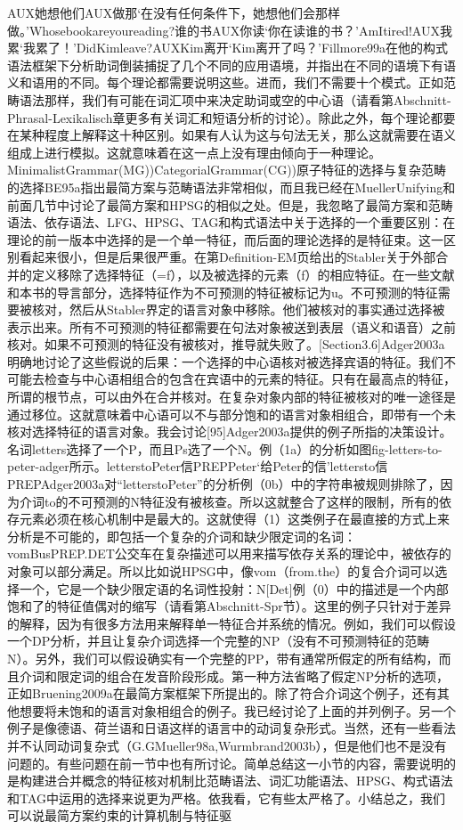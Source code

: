 AUX她想他们AUX做那`在没有任何条件下，她想他们会那样做。'Whosebookareyoureading?谁的书AUX你读`你在读谁的书？'AmItired!AUX我累`我累了！'DidKimleave?AUXKim离开`Kim离开了吗？'Fillmore99a在他的构式语法框架下分析助词倒装捕捉了几个不同的应用语境，并指出在不同的语境下有语义和语用的不同。每个理论都需要说明这些。进而，我们不需要十个模式。正如范畴语法那样，我们有可能在词汇项中来决定助词或空的中心语（请看第Abschnitt-Phrasal-Lexikalisch章更多有关词汇和短语分析的讨论）。除此之外，每个理论都要在某种程度上解释这十种区别。如果有人认为这与句法无关，那么这就需要在语义组成上进行模拟。这就意味着在这一点上没有理由倾向于一种理论。MinimalistGrammar(MG))CategorialGrammar(CG))原子特征的选择与复杂范畴的选择BE95a指出最简方案与范畴语法非常相似，而且我已经在MuellerUnifying和前面几节中讨论了最简方案和HPSG的相似之处。但是，我忽略了最简方案和范畴语法、依存语法、LFG、HPSG、TAG和构式语法中关于选择的一个重要区别：在理论的前一版本中选择的是一个单一特征，而后面的理论选择的是特征束。这一区别看起来很小，但是后果很严重。在第Definition-EM页给出的Stabler关于外部合并的定义移除了选择特征（=f），以及被选择的元素（f）的相应特征。在一些文献和本书的导言部分，选择特征作为不可预测的特征被标记为u。不可预测的特征需要被核对，然后从Stabler界定的语言对象中移除。他们被核对的事实通过选择被表示出来。所有不可预测的特征都需要在句法对象被送到表层（语义和语音）之前核对。如果不可预测的特征没有被核对，推导就失败了。[Section3.6]Adger2003a明确地讨论了这些假说的后果：一个选择的中心语核对被选择宾语的特征。我们不可能去检查与中心语相组合的包含在宾语中的元素的特征。只有在最高点的特征，所谓的根节点，可以由外在合并核对。在复杂对象内部的特征被核对的唯一途径是通过移位。这就意味着中心语可以不与部分饱和的语言对象相组合，即带有一个未核对选择特征的语言对象。我会讨论[95]Adger2003a提供的例子所指的决策设计。名词letters选择了一个P，而且Ps选了一个N。例（1a）的分析如图fig-letters-to-peter-adger所示。letterstoPeter信PREPPeter`给Peter的信'lettersto信PREPAdger2003a对“letterstoPeter”的分析例（0b）中的字符串被规则排除了，因为介词to的不可预测的N特征没有被核查。所以这就整合了这样的限制，所有的依存元素必须在核心机制中是最大的。这就使得（1）这类例子在最直接的方式上来分析是不可能的，即包括一个复杂的介词和缺少限定词的名词：vomBusPREP.DET公交车在复杂描述可以用来描写依存关系的理论中，被依存的对象可以部分满足。所以比如说HPSG中，像vom（from.the）的复合介词可以选择一个，它是一个缺少限定语的名词性投射：N[Det]例（0）中的描述是一个内部饱和了的特征值偶对的缩写（请看第Abschnitt-Spr节）。这里的例子只针对于差异的解释，因为有很多方法用来解释单一特征合并系统的情况。例如，我们可以假设一个DP分析，并且让复杂介词选择一个完整的NP（没有不可预测特征的范畴N）。另外，我们可以假设确实有一个完整的PP，带有通常所假定的所有结构，而且介词和限定词的组合在发音阶段形成。第一种方法省略了假定NP分析的选项，正如Bruening2009a在最简方案框架下所提出的。除了符合介词这个例子，还有其他想要将未饱和的语言对象相组合的例子。我已经讨论了上面的并列例子。另一个例子是像德语、荷兰语和日语这样的语言中的动词复杂形式。当然，还有一些看法并不认同动词复杂式（G.GMueller98a,Wurmbrand2003b），但是他们也不是没有问题的。有些问题在前一节中也有所讨论。简单总结这一小节的内容，需要说明的是构建进合并概念的特征核对机制比范畴语法、词汇功能语法、HPSG、构式语法和TAG中运用的选择来说更为严格。依我看，它有些太严格了。小结总之，我们可以说最简方案约束的计算机制与特征驱